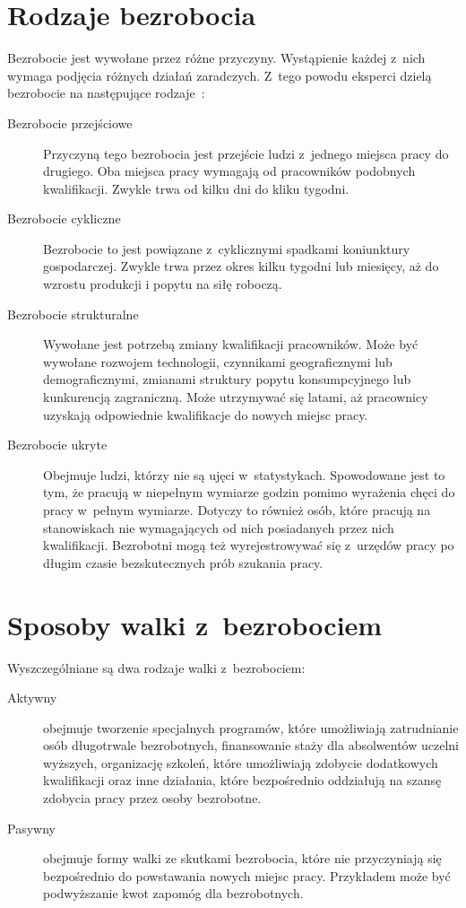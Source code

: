 \documentclass[12pt]{article}
\begin{document}
    \section*{Rodzaje bezrobocia}
    Bezrobocie jest wywołane przez różne przyczyny. Wystąpienie każdej z~nich wymaga podjęcia różnych działań zaradczych. Z~tego powodu eksperci dzielą bezrobocie na następujące rodzaje~\cite{eko}:
    \begin{description}
        \item[Bezrobocie przejściowe] Przyczyną tego bezrobocia jest przejście ludzi z~jednego miejsca pracy do drugiego. Oba miejsca pracy wymagają od pracowników podobnych kwalifikacji. Zwykle trwa od kilku dni do kliku tygodni.
        \item[Bezrobocie cykliczne] Bezrobocie to jest powiązane z~cyklicznymi spadkami koniunktury gospodarczej. Zwykle trwa przez okres kilku tygodni lub miesięcy, aż do wzrostu produkcji i popytu na siłę roboczą.
        \item[Bezrobocie strukturalne] Wywołane jest potrzebą zmiany kwalifikacji pracowników. Może być wywołane rozwojem technologii, czynnikami geograficznymi lub demograficznymi, zmianami struktury popytu konsumpcyjnego lub kunkurencją zagraniczną. Może utrzymywać się latami, aż pracownicy uzyskają odpowiednie kwalifikacje do nowych miejsc pracy.
        \item[Bezrobocie ukryte] Obejmuje ludzi, którzy nie są ujęci w~statystykach. Spowodowane jest to tym, że pracują w niepełnym wymiarze godzin pomimo wyrażenia chęci do pracy w~pełnym wymiarze. Dotyczy to również osób, które pracują na stanowiskach nie wymagających od nich posiadanych przez nich kwalifikacji. Bezrobotni mogą też wyrejestrowywać się z~urzędów pracy po długim czasie bezskutecznych prób szukania pracy.
    \end{description}

    \section*{Sposoby walki z~bezrobociem}
    
    Wyszczególniane są dwa rodzaje walki z~bezrobociem:
    
    \begin{description}
        \item[Aktywny] obejmuje tworzenie specjalnych programów, które umożliwiają zatrudnianie osób długotrwale bezrobotnych, finansowanie staży dla absolwentów uczelni wyższych, organizację szkoleń, które umożliwiają zdobycie dodatkowych kwalifikacji oraz inne działania, które bezpośrednio oddziałują na szansę zdobycia pracy przez osoby bezrobotne.
        \item[Pasywny] obejmuje formy walki ze skutkami bezrobocia, które nie przyczyniają się bezpośrednio do powstawania nowych miejsc pracy. Przykładem może być podwyższanie kwot zapomóg dla bezrobotnych.
    \end{description}
   
\end{document}

